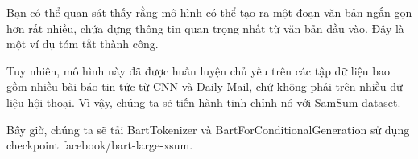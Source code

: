 Bạn có thể quan sát thấy rằng mô hình có thể tạo ra một đoạn văn bản ngắn gọn hơn rất nhiều, chứa đựng thông tin quan trọng nhất từ văn bản đầu vào. Đây là một ví dụ tóm tắt thành công.

Tuy nhiên, mô hình này đã được huấn luyện chủ yếu trên các tập dữ liệu bao gồm nhiều bài báo tin tức từ CNN và Daily Mail, chứ không phải trên nhiều dữ liệu hội thoại. Vì vậy, chúng ta sẽ tiến hành tinh chỉnh nó với SamSum dataset.
    
Bây giờ, chúng ta sẽ tải BartTokenizer và BartForConditionalGeneration sử dụng checkpoint facebook/bart-large-xsum.\\
